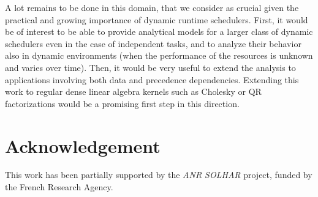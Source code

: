 \documentclass[a4paper,10pt]{article}
\begin{document}
A lot remains to be done in this domain, that we consider as crucial
given the practical and growing importance of dynamic runtime
schedulers. First, it would be of interest to be able to provide
analytical models for a larger class of dynamic schedulers even in the
case of independent tasks, and to analyze their behavior also in
dynamic environments (when the performance of the resources is unknown
and varies over time). Then, it would be very useful to extend the
analysis to applications involving both data and precedence
dependencies. Extending this work to regular dense linear algebra
kernels such as Cholesky or QR factorizations would be a promising first step in
this direction.



 


\section{Acknowledgement}

This work has been partially supported by the {\em ANR SOLHAR}
project, funded by the French Research Agency.
\end{document}
